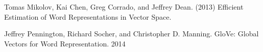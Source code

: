 \documentclass{article}
\begin{document}




\begin{thebibliography}{99} %

Tomas Mikolov, Kai Chen, Greg Corrado, and Jeffrey Dean. (2013)
\newblock Efficient Estimation of Word Representations in Vector Space.

Jeffrey Pennington, Richard Socher, and Christopher D. Manning. GloVe: Global Vectors for Word Representation. 2014
\end{thebibliography}

\end{document}
